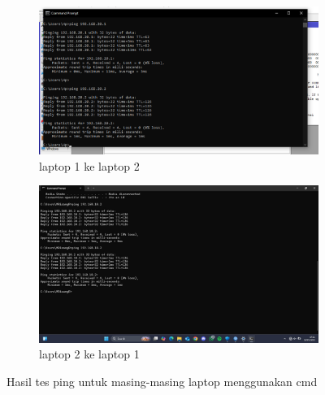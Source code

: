 \begin{figure}[H]
    \centering
    \begin{subfigure}[b]{0.3\linewidth}
      \centering
      \includegraphics[width=\linewidth]{image/routing2.png}
      \caption{laptop 1 ke laptop 2}
    \end{subfigure}
    \hspace{1cm}
    \begin{subfigure}[b]{0.3\linewidth}
      \centering
      \includegraphics[width=\linewidth]{image/routing3.jpg}
      \caption{laptop 2 ke laptop 1}
    \end{subfigure}
    \caption{Hasil tes ping untuk masing-masing laptop menggunakan cmd}
\end{figure}

